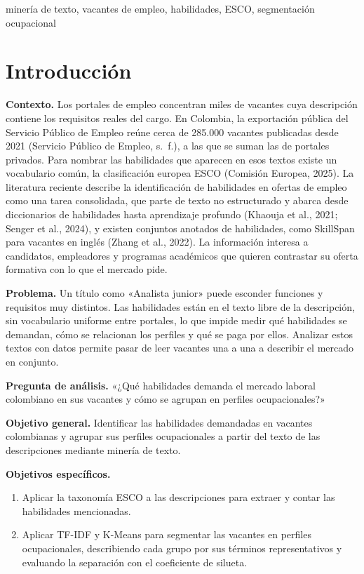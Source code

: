 \documentclass[journal]{IEEEtran}
\begin{document}
\begin{IEEEkeywords}
minería de texto, vacantes de empleo, habilidades, ESCO, segmentación ocupacional
\end{IEEEkeywords}

\IEEEpeerreviewmaketitle

\section{Introducción}
\textbf{Contexto.} Los portales de empleo concentran miles de vacantes cuya descripción contiene los requisitos reales del cargo. En Colombia, la exportación pública del Servicio Público de Empleo reúne cerca de 285.000 vacantes publicadas desde 2021 (Servicio Público de Empleo, s.~f.), a las que se suman las de portales privados. Para nombrar las habilidades que aparecen en esos textos existe un vocabulario común, la clasificación europea ESCO (Comisión Europea, 2025). La literatura reciente describe la identificación de habilidades en ofertas de empleo como una tarea consolidada, que parte de texto no estructurado y abarca desde diccionarios de habilidades hasta aprendizaje profundo (Khaouja et al., 2021; Senger et al., 2024), y existen conjuntos anotados de habilidades, como SkillSpan para vacantes en inglés (Zhang et al., 2022). La información interesa a candidatos, empleadores y programas académicos que quieren contrastar su oferta formativa con lo que el mercado pide.

\textbf{Problema.} Un título como «Analista junior» puede esconder funciones y requisitos muy distintos. Las habilidades están en el texto libre de la descripción, sin vocabulario uniforme entre portales, lo que impide medir qué habilidades se demandan, cómo se relacionan los perfiles y qué se paga por ellos. Analizar estos textos con datos permite pasar de leer vacantes una a una a describir el mercado en conjunto.

\textbf{Pregunta de análisis.} «¿Qué habilidades demanda el mercado laboral colombiano en sus vacantes y cómo se agrupan en perfiles ocupacionales?»

\textbf{Objetivo general.} Identificar las habilidades demandadas en vacantes colombianas y agrupar sus perfiles ocupacionales a partir del texto de las descripciones mediante minería de texto.

\textbf{Objetivos específicos.}
\begin{enumerate}
\setlength{\itemsep}{1pt}
\item Aplicar la taxonomía ESCO a las descripciones para extraer y contar las habilidades mencionadas.
\item Aplicar TF-IDF y K-Means para segmentar las vacantes en perfiles ocupacionales, describiendo cada grupo por sus términos representativos y evaluando la separación con el coeficiente de silueta.
\end{enumerate}
\end{document}
